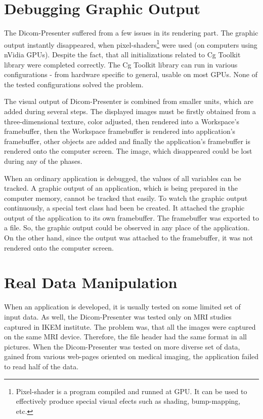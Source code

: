 \section{Debugging Graphic Output}
The Dicom-Presenter suffered from a few issues in its rendering part. The graphic output instantly disappeared, when pixel-shaders\footnote{Pixel-shader is a program compiled and runned at GPU. It can be used to effectively produce special visual efects such as shading, bump-mapping, etc.} were used (on computers using nVidia GPUs). Despite the fact, that all initializations related to Cg Toolkit library were completed correctly. The Cg Toolkit library can run in various configurations - from hardware specific to general, usable on most GPUs. None of the tested configurations solved the problem.

The visual output of Dicom-Presenter is combined from smaller units, which are added during several steps. The displayed images must be firstly obtained from a three-dimensional texture, color adjusted, then rendered into a Workspace's framebuffer, then the Workspace framebuffer is rendered into application's framebuffer, other objects are added and finally the application's framebuffer is rendered onto the computer screen. The image, which disappeared could be lost during any of the phases.

When an ordinary application is debugged, the values of all variables can be tracked. A graphic output of an application, which is being prepared in the computer memory, cannot be tracked that easily. To watch the graphic output continuously, a special test class had been be created. It attached the graphic output of the application to its own framebuffer. The framebuffer was exported to a file. So, the graphic output could be observed in any place of the application. On the other hand, since the output was attached to the framebuffer, it was not rendered onto the computer screen.

\section{Real Data Manipulation}
When an application is developed, it is usually tested on some limited set of input data. As well, the Dicom-Presenter was tested only on MRI studies captured in IKEM institute. The problem was, that all the images were captured on the same MRI device. Therefore, the file header had the same format in all pictures. When the Dicom-Presenter was tested on more diverse set of data, gained from various web-pages oriented on medical imaging, the application failed to read half of the data.

